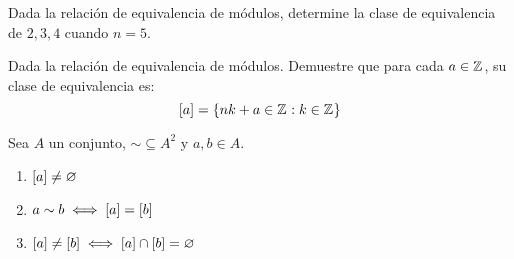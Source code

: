 \begin{frame}
	
\end{frame}
\begin{frame}
	\begin{exercise}
		Dada la relación de equivalencia de módulos, determine la clase de equivalencia de $ 2, 3, 4 $ cuando $ n = 5 $.
	\end{exercise}
\end{frame}
\begin{frame}
	
\end{frame}
\begin{frame}
	\begin{exercise}
		Dada la relación de equivalencia de módulos. Demuestre que para cada $ a\in\mathbb{Z}^{} $, su clase de equivalencia es:
		\[ \left[ a \right] =\left\{ nk + a\in\mathbb{Z}^{}: k\in\mathbb{Z}^{} \right\} \]
	\end{exercise}
\end{frame}
\begin{frame}
	\begin{mtheorem}
		\label{thm: clases}
		Sea $ A $ un conjunto, $ \sim\subseteq A^{2} $ y $ a, b\in A $.
		\begin{enumerate}
			\item $ \left[ a \right]\neq\varnothing $
			\item $ a\sim b\iff\left[ a \right] =\left[ b \right] $
			\item $ \left[ a \right]\neq\left[ b \right]\iff\left[ a \right]\cap\left[ b \right] =\varnothing $
		\end{enumerate}
	\end{mtheorem}
\end{frame}
